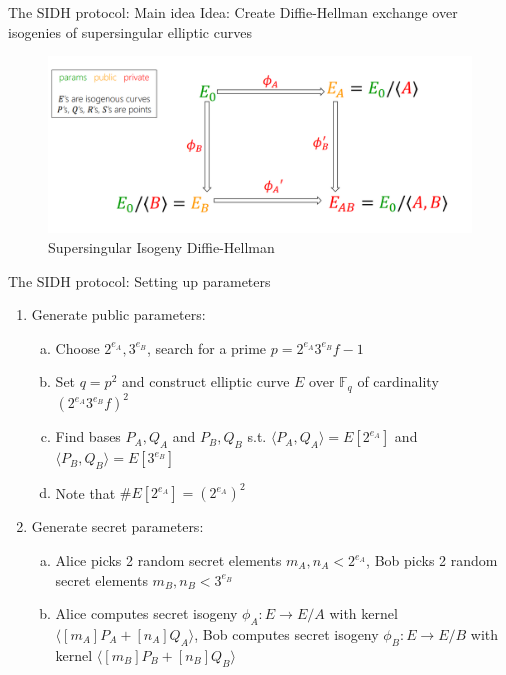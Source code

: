\documentclass[handout]{beamer}
\begin{document}
\begin{frame}{The SIDH protocol: Main idea}
Idea: Create Diffie-Hellman exchange over isogenies of supersingular elliptic curves %
\begin{figure}
	\begin{minipage}{0.75\textwidth}
		\centering
		\includegraphics[width=1\linewidth]{sidh_costello_1}
		\caption{Supersingular Isogeny Diffie-Hellman}\label{fig:dldh}
	\end{minipage}\hfill
\end{figure}

\end{frame}


\begin{frame}{The SIDH protocol: Setting up parameters}
\begin{enumerate}[1.]
	\item Generate public parameters:
	\begin{enumerate}[(a)]
		\item Choose $2^{e_A},3^{e_B}$, search for a prime $p=2^{e_A}3^{e_B}f- 1$\pause %
		\item Set $q=p^2$ and construct elliptic curve $E$ over $\mathbb{F}_q$ of cardinality $(2^{e_A}3^{e_B}f)^2$\pause %
		\item Find bases $P_A,Q_A$ and $P_B,Q_B$ s.t. $\langle P_A,Q_A\rangle = E[2^{e_A}]$ and $\langle P_B,Q_B\rangle = E[3^{e_B}]$ \pause  %
		\item Note that $\#E[2^{e_A}] =(2^{e_A})^2$
	\end{enumerate}
	\item Generate secret parameters:
	\begin{enumerate}[(a)]
		\item Alice picks 2 random secret elements $m_A,n_A < 2^{e_A}$, Bob picks 2 random secret elements $m_B,n_B < 3^{e_B}$\pause
		\item Alice computes secret isogeny $\phi_A : E \to E/A$ with kernel $\langle [m_A]P_A+[n_A]Q_A\rangle$, Bob computes secret isogeny $\phi_B : E \to E/B$ with kernel $\langle [m_B]P_B+[n_B]Q_B\rangle$
	\end{enumerate}

\end{enumerate}
\end{frame}
\end{document}

